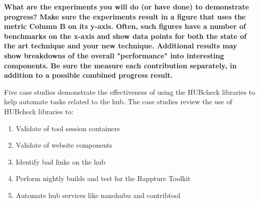 \documentclass[letterpaper]{article}
\begin{document}
\textbf{
What are the experiments you will do (or have done) to demonstrate progress?
Make sure the experiments result in a figure that uses the metric Column B on
its y-axis. Often, such figures have a number of benchmarks on the x-axis and
show data points for both the state of the art technique and your new
technique. Additional results may show breakdowns of the overall
"performance" into interesting components. Be sure the measure each
contribution separately, in addition to a possible combined progress result.
}

Five case studies demonstrate the effectiveness of using the HUBcheck libraries
to help automate tasks related to the hub. The case studies review the use of
HUBcheck libraries to:

\begin{enumerate}
\item Validate of tool session containers
\item Validate of website components
\item Identify bad links on the hub
\item Perform nightly builds and test for the Rappture Toolkit
\item Automate hub services like nanohubu and contribtool
\end{enumerate}
\end{document}
